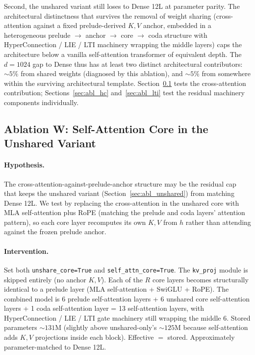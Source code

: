 \documentclass{article}
\begin{document}
Second, the unshared variant still loses to Dense 12L at parameter parity. The architectural distinctness that survives the removal of weight sharing (cross-attention against a fixed prelude-derived $K, V$ anchor, embedded in a heterogeneous prelude $\to$ anchor $\to$ core $\to$ coda structure with HyperConnection / LIE / LTI machinery wrapping the middle layers) caps the architecture below a vanilla self-attention transformer of equivalent depth. The $d{=}1024$ gap to Dense thus has at least two distinct architectural contributors: $\sim 5\%$ from shared weights (diagnosed by this ablation), and $\sim 5\%$ from somewhere within the surviving architectural template. Section~\ref{sec:abl_selfattn} tests the cross-attention contribution; Sections~\ref{sec:abl_hc} and~\ref{sec:abl_lti} test the residual machinery components individually.

\subsection{Ablation W: Self-Attention Core in the Unshared Variant}
\label{sec:abl_selfattn}

\paragraph{Hypothesis.}
The cross-attention-against-prelude-anchor structure may be the residual cap that keeps the unshared variant (Section~\ref{sec:abl_unshared}) from matching Dense 12L. We test by replacing the cross-attention in the unshared core with MLA self-attention plus RoPE (matching the prelude and coda layers' attention pattern), so each core layer recomputes its own $K, V$ from $h$ rather than attending against the frozen prelude anchor.

\paragraph{Intervention.}
Set both \texttt{unshare\_core=True} and \texttt{self\_attn\_core=True}. The \texttt{kv\_proj} module is skipped entirely (no anchor $K, V$). Each of the $R$ core layers becomes structurally identical to a prelude layer (MLA self-attention + SwiGLU + RoPE). The combined model is 6 prelude self-attention layers + 6 unshared core self-attention layers + 1 coda self-attention layer = 13 self-attention layers, with HyperConnection / LIE / LTI gate machinery still wrapping the middle 6. Stored parameters $\sim 131$M (slightly above unshared-only's $\sim 125$M because self-attention adds $K, V$ projections inside each block). Effective $=$ stored. Approximately parameter-matched to Dense 12L.
\end{document}
